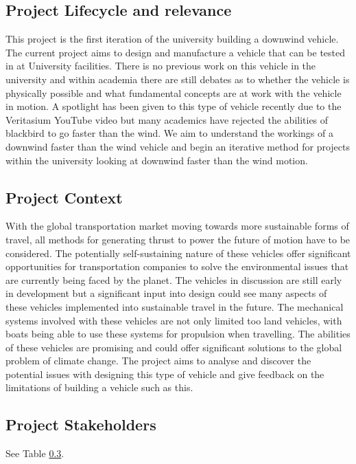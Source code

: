 \subsection{Project Lifecycle and relevance}

This project is the first iteration of the university building a downwind vehicle. The current project aims to design and manufacture a vehicle that can be tested in at University facilities. There is no previous work on this vehicle in the university and within academia there are still debates as to whether the vehicle is physically possible and what fundamental concepts are at work with the vehicle in motion. A spotlight has been given to this type of vehicle recently due to the Veritasium YouTube video but many academics have rejected the abilities of blackbird to go faster than the wind. We aim to understand the workings of a downwind faster than the wind vehicle and begin an iterative method for projects within the university looking at downwind faster than the wind motion.

\subsection{Project Context}

With the global transportation market moving towards more sustainable forms of travel, all methods for generating thrust to power the future of motion have to be considered. The potentially self-sustaining nature of these vehicles offer significant opportunities for transportation companies to solve the environmental issues that are currently being faced by the planet. The vehicles in discussion are still early in development but a significant input into design could see many aspects of these vehicles implemented into sustainable travel in the future. The mechanical systems involved with these vehicles are not only limited too land vehicles, with boats being able to use these systems for propulsion when travelling. The abilities of these vehicles are promising and could offer significant solutions to the global problem of climate change. The project aims to analyse and discover the potential issues with designing this type of vehicle and give feedback on the limitations of building a vehicle such as this.

\subsection{Project Stakeholders}

See Table \ref{}.


